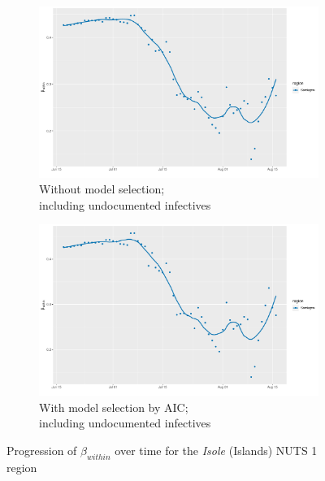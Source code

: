 \documentclass[12pt]{article}
\begin{document}
\begin{appendices}
\begin{figure}[H]
\begin{subfigure}{\textwidth}
    	      \includegraphics[width=0.95\linewidth]{output/model_within_lag14_betawithin_Isole_UndocQuadratic_rolling.pdf}
    	      \caption{Without model selection; \\ including undocumented infectives}
    	      \label{fig:beta_within_over_time_isole_regular_undoc}
    	    \end{subfigure}\newline
    	    \begin{subfigure}{\textwidth}
    	      \centering
    	      \includegraphics[width=0.95\linewidth]{output/model_within_lag14_betawithin_Isole_aic_UndocQuadratic_rolling.pdf}
    	      \caption{With model selection by AIC; \\ including undocumented infectives}
    	      \label{fig:beta_within_over_time_isole_aic_undoc}
    	    \end{subfigure}
    	    \caption{Progression of $\beta_{within}$ over time for the \textit{Isole} (Islands) NUTS 1 region}
    	    \label{fig:beta_within_over_time_isole}
	    \end{figure}
		

\end{appendices}
\end{document}
